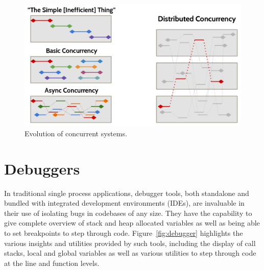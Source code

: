 \documentclass[12pt,pdftex,titlepage]{report}
\begin{document}
            \begin{figure}[htb!]
                \centering
                \includegraphics[scale=1.1]{concurrency.png}
                \caption{Evolution of concurrent systems.}
                \label{fig:concurrency}
            \end{figure}
        
        \section{Debuggers}
            In traditional single process applications, debugger tools, both standalone and bundled with integrated development environments (IDEs), are invaluable in their
            use of isolating bugs in codebases of any size. They have the capability to give complete overview of stack and heap allocated variables as well as being able to set
            breakpoints to step through code. Figure~\ref{fig:debugger} highlights the various insights and utilities provided by such tools, including the display of call stacks,
            local and global variables as well as various utilities to step through code at the line and function levels.
\end{document}
